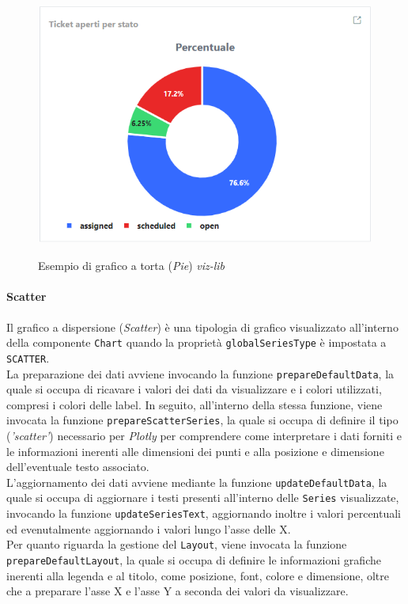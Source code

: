 \begin{figure}[H]
    \centering
    \includegraphics[alt={Esempio di grafico a torta viz-lib}, width=0.8 \columnwidth, height=\maxdimen, keepaspectratio]{img/ex_pie.png}
    \caption{Esempio di grafico a torta (\textit{Pie}) \textit{viz-lib}}
    \label{fig:pie-example}
\end{figure}

\paragraph{Scatter}
Il grafico a dispersione (\textit{Scatter}) è una tipologia di grafico visualizzato all'interno della componente \texttt{Chart} quando la proprietà \texttt{globalSeriesType} è impostata a \texttt{SCATTER}. \\
La preparazione dei dati avviene invocando la funzione \texttt{prepareDefaultData}, la quale si occupa di ricavare i valori dei dati da visualizzare e i colori utilizzati, compresi i
colori delle label. In seguito, all'interno della stessa funzione, viene invocata la funzione \texttt{prepareScatterSeries}, la quale si occupa di definire il tipo (\textit{'scatter'}) necessario per \textit{Plotly}
per comprendere come interpretare i dati forniti e le informazioni inerenti alle dimensioni dei punti e alla posizione e dimensione dell'eventuale testo associato. \\
L'aggiornamento dei dati avviene mediante la funzione \texttt{updateDefaultData}, la quale si occupa di aggiornare i testi presenti all'interno delle \texttt{Series} visualizzate, invocando la funzione
\texttt{updateSeriesText}, aggiornando inoltre i valori percentuali ed evenutalmente aggiornando i valori lungo l'asse delle X. \\
Per quanto riguarda la gestione del \texttt{Layout}, viene invocata la funzione \\
\texttt{prepareDefaultLayout}, la quale si occupa di definire le informazioni grafiche inerenti alla legenda e al titolo, come posizione,
font, colore e dimensione, oltre che a preparare l'asse X e l'asse Y a seconda dei valori da visualizzare.

